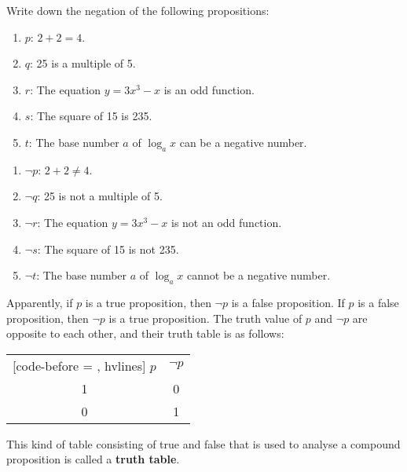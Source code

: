 \documentclass{report}
\newcounter{example}
\begin{document}
\vspace{0.5cm}
\begin{example}
    \item Write down the negation of the following propositions:
    \begin{enumerate}[label=, leftmargin=*]
        \item $p$: $2 + 2 = 4$.
        \item $q$: 25 is a multiple of 5.
        \item $r$: The equation $y = 3x^3 - x$ is an odd function.
        \item $s$: The square of 15 is 235.
        \item $t$: The base number $a$ of $\log_a x$ can be a negative number.
    \end{enumerate}
\end{example}
\begin{solution}
    \item \begin{enumerate}[label=, leftmargin=*]
        \item $\neg p$: $2 + 2 \neq 4$.
        \item $\neg q$: 25 is not a multiple of 5.
        \item $\neg r$: The equation $y = 3x^3 - x$ is not an odd function.
        \item $\neg s$: The square of 15 is not 235.
        \item $\neg t$: The base number $a$ of $\log_a x$ cannot be a negative number.
    \end{enumerate}
\end{solution}

Apparently, if $p$ is a true proposition, then $\neg p$ is a false proposition.
If $p$ is a false proposition, then $\neg p$ is a true proposition. The truth
value of $p$ and $\neg p$ are opposite to each other, and their truth table is
as follows:
\begin{center}
    \begin{NiceTabular}{|c|c|}[code-before = , hvlines]
        $p$ & $\neg p$ \\
        1   & 0        \\
        0   & 1        \\
    \end{NiceTabular}
\end{center}
This kind of table consisting of true and false that is used to analyse a compound proposition is called a \textbf{truth table}.
\end{document}
